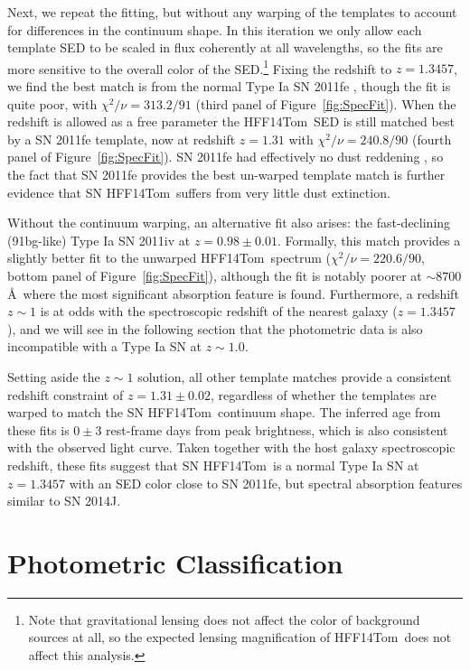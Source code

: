 \documentclass[iop]{emulateapj}
\def\tomas{HFF14Tom}
\begin{document}
Next, we repeat the fitting, but without any warping of the templates
to account for differences in the continuum shape.  In this iteration
we only allow each template SED to be scaled in flux coherently at all
wavelengths, so the fits are more sensitive to the overall color of
the SED.\footnote{Note that gravitational lensing does not affect the color of background sources at all, so the expected lensing magnification of \tomas\ does not affect this analysis.}  Fixing the redshift to $z=1.3457$, we find the best match is
from the normal Type Ia SN 2011fe \citep{Mazzali:2014}, though the fit is quite poor, with
$\chi^2/\nu=313.2/91$ (third panel of Figure~\ref{fig:SpecFit}).  When
the redshift is allowed as a free parameter the \tomas\ SED is still
matched best by a SN 2011fe template, now at redshift $z=1.31$ with
$\chi^2/\nu=240.8/90$ (fourth panel of Figure~\ref{fig:SpecFit}).  
SN 2011fe had effectively no dust reddening \citep[e.g.][]{Nugent:2011,Li:2011c}, so the fact that SN 2011fe provides the best un-warped template match is further evidence that SN \tomas\ suffers from very little dust extinction.

Without the continuum warping, an alternative fit also arises: the
fast-declining (91bg-like) Type Ia SN 2011iv \citep{Foley:2012b} at
$z=0.98\pm0.01$. Formally, this match provides a slightly better fit
to the unwarped \tomas\ spectrum ($\chi^2/\nu=220.6/90$,
bottom panel of Figure~\ref{fig:SpecFit}), although the fit is
notably poorer at $\sim8700$\AA\ where the most significant absorption
feature is found. Furthermore, a redshift $z\sim1$ is at odds with the
spectroscopic redshift of the nearest galaxy ($z=1.3457$), and we will
see in the following section that the photometric data is also
incompatible with a Type Ia SN at $z\sim1.0$.

Setting aside the $z\sim1$ solution, all other template matches
provide a consistent redshift constraint of $z=1.31\pm0.02$,
regardless of whether the templates are warped to match the SN \tomas\
continuum shape.  The inferred age from these fits is $0\pm3$
rest-frame days from peak brightness, which is also consistent with
the observed light curve.  Taken together with the host galaxy
spectroscopic redshift, these fits suggest that SN \tomas\ is a normal
Type Ia SN at $z=1.3457$ with an SED color close to SN 2011fe, but
spectral absorption features similar to SN 2014J.


\section{Photometric Classification}
\label{sec:PhotometricClassification}
\end{document}
